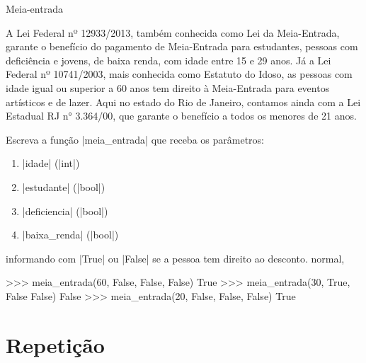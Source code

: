 	\begin{problem}{Meia-entrada}%

	A Lei Federal nº 12933/2013, também conhecida como Lei da Meia-Entrada, garante o benefício do pagamento de Meia-Entrada para estudantes, pessoas com deficiência e jovens, de baixa renda, com idade entre 15 e 29 anos. Já a Lei Federal nº 10741/2003, mais conhecida como Estatuto do Idoso, as pessoas com idade igual ou superior a 60 anos tem direito à Meia-Entrada para eventos artísticos e de lazer. Aqui no estado do Rio de Janeiro, contamos ainda com a Lei Estadual RJ n° 3.364/00, que garante o benefício a todos os menores de 21 anos. \par
	
	\proposal Escreva a função |meia\_entrada| que receba os parâmetros:
	\begin{enumerate} 
		\item |idade| (|int|)
		\item |estudante| (|bool|)
		\item |deficiencia| (|bool|)
		\item |baixa\_renda| (|bool|)
	\end{enumerate}
	informando com |True| ou |False| se a pessoa tem direito ao desconto. normal,
    
	\begin{lstpython}
    >>> meia_entrada(60, False, False, False)
    True
    >>> meia_entrada(30, True, False False)
    False
    >>> meia_entrada(20, False, False, False)
    True
	\end{lstpython}
	\end{problem}


	\section*{Repetição}%


